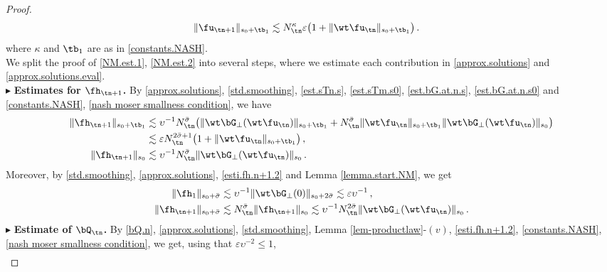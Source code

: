 \documentclass[a4paper,reqno,10pt]{article}
\begin{document}
\begin{proof}
\begin{align}
    \| \fu_{\tn+1}\|_{s_0+\tb_{1}} & \lesssim N_{\tn}^{\kappa} \varepsilon\big( 1+ \|\wt\fu_{\tn} \|_{s_0+\tb_{1}} \big)\,.\label{NM.est.2}
\end{align}
where $\kappa$ and $\tb_{1}$ are as in \eqref{constants.NASH}. \\
We split the proof of \eqref{NM.est.1}, \eqref{NM.est.2} into several steps, where we estimate each contribution in \eqref{approx.solutions} and \eqref{approx.solutions.eval}.
\\[1mm]
\noindent $\blacktriangleright$ {\bf Estimates for $\fh_{\tn+1}$.} By \eqref{approx.solutions}, \eqref{std.smoothing}, \eqref{est.sTn.s}, \eqref{est.sTm.s0}, \eqref{est.bG.at.n.s}, \eqref{est.bG.at.n.s0} and \eqref{constants.NASH}, \eqref{nash moser smallness condition}, we have
\begin{align}
    \| \fh_{\tn+1} \|_{s_0+\tb_{1}} & \lesssim \upsilon^{-1} N_{\tn}^{\bar\sigma} \big( \|  \wt\bG_{\perp}(\wt\fu_{\tn}) \|_{s_0+\tb_{1}} + N_{\tn}^{\bar\sigma} \| \wt\fu_{\tn} \|_{s_0+\tb_{1}} \| \wt\bG_{\perp}(\wt\fu_{\tn}) \|_{s_0}  \big)  \label{esti.fh.n+1.1} \\
    & \lesssim \varepsilon N_{\tn}^{2\bar\sigma+1} \big( 1 + \| \wt\fu_{\tn} \|_{s_0+\tb_{1}}  \big) \,, \\
     \| \fh_{\tn+1} \|_{s_0} & \lesssim \upsilon^{-1} N_{\tn}^{\bar\sigma } \| \wt\bG_{\perp}(\wt\fu_{\tn}) \|_{s_0} \,. \label{esti.fh.n+1.2}
\end{align}
Moreover, by  \eqref{std.smoothing}, \eqref{approx.solutions}, \eqref{esti.fh.n+1.2} and Lemma \ref{lemma.start.NM}, we get
\begin{align}
    \| \fh_{1} \|_{s_0+\bar\sigma} & \lesssim \upsilon^{-1} \| \wt\bG_{\perp}(0)\|_{s_0+2\bar\sigma} \lesssim \varepsilon \upsilon^{-1}\,, \label{fh1} \\
     \| \fh_{\tn+1} \|_{s_0+\bar\sigma} &  \lesssim N_{\tn}^{\bar\sigma} \| \fh_{\tn+1} \|_{s_0} \lesssim \upsilon^{-1} N_{\tn}^{2\bar\sigma} \| \wt\bG_{\perp}(\wt\fu_{\tn}) \|_{s_0} \,.  \label{fhn+1}
\end{align}
\noindent $\blacktriangleright$ {\bf Estimate of $\bQ_{\tn}$.} By \eqref{bQ.n}, \eqref{approx.solutions}, \eqref{std.smoothing}, Lemma \ref{lem-productlaw}-$(v)$,
\eqref{esti.fh.n+1.2}, \eqref{constants.NASH}, \eqref{nash moser smallness condition}, we get, using that $\varepsilon\upsilon^{-2}\leq 1$,
\begin{align}

\end{align}
\end{proof}
\end{document}
